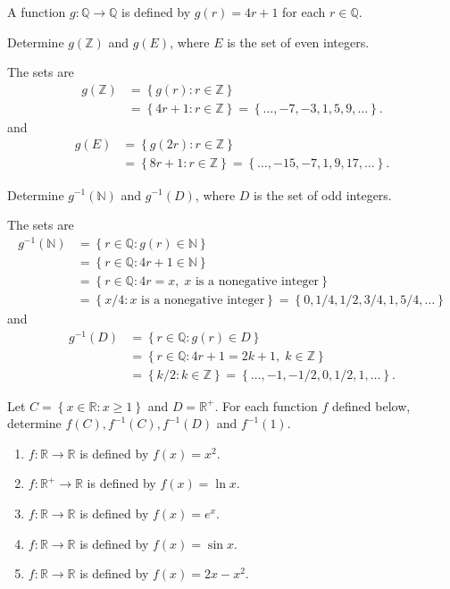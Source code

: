 \documentclass[12pt]{article}
\newcommand{\N}{\mathbb{N}}
\newcommand{\Z}{\mathbb{Z}}
\newcommand{\R}{\mathbb{R}}
\newcommand{\Q}{\mathbb{Q}}
\newenvironment{problem}[2][Problem]{\begin{trivlist} \item[\hskip \labelsep {\bfseries #1}\hskip \labelsep {\bfseries #2.}]}{\end{trivlist}}
\newenvironment{solution}[2][Solution]{\begin{trivlist} \item[\hskip \labelsep {\bfseries #1}\hskip \labelsep {\bfseries #2.}]}{\end{trivlist}}
\begin{document}
    \begin{problem}{10}
      A function $g:\Q\to \Q$ is defined by $g(r) = 4r+1$ for each $r\in \Q$.
      \begin{enumerate}[label=(\alph*)]
	\item Determine $g(\Z)$ and $g(E)$, where $E$ is the set of even integers.
	  \begin{solution}{(a)}
	    The sets are
    \begin{align*}
      g(\Z) &= \left\{g(r):r\in\Z \right\}\\
    &= \left\{4r+1:r\in\Z \right\}=\left\{\dots,-7,-3,1,5,9,\dots\right\}.
    \end{align*}
    and
    \begin{align*}
      g(E) &= \left\{g(2r):r\in\Z\right\}\\
      &= \left\{8r+1:r\in\Z\right\}=\left\{\dots,-15,-7,1,9,17,\dots\right\}.
    \end{align*}
    \end{solution}
	\item Determine $g^{-1}(\N)$ and $g^{-1}(D)$, where $D$ is the set of odd integers.
    \begin{solution}{(b)}
      The sets are
    \begin{align*}
      g^{-1}(\N) &= \left\{r\in\Q:g(r)\in\N\right\}\\
      &= \left\{r\in\Q:4r+1\in\N\right\}\\
      &= \left\{r\in\Q:4r=x, \; x\text{ is a nonegative integer}\right\}\\
      &= \left\{x/4: x\text{ is a nonegative integer}\right\} = \left\{0,1/4,1/2,3/4,1,5/4,\dots\right\}
    \end{align*}
    and
    \begin{align*}
      g^{-1}(D) &= \left\{r\in\Q:g(r)\in D\right\}\\
      &= \left\{r\in\Q: 4r+1=2k+1,\; k\in\Z\right\}\\
      &= \left\{k/2: k\in\Z\right\} = \left\{\dots,-1,-1/2,0,1/2,1,\dots\right\}.
    \end{align*}
    \end{solution}
    \end{enumerate}
    \end{problem}

    \begin{problem}{11}
      Let $C=\left\{ x\in\R:x\geq 1 \right\}$ and $D=\R^{+}$. For each function $f$ defined below, determine $f(C),f^{-1}(C),f^{-1}(D)$ and $f^{-1}({1})$.
      \begin{enumerate}[label=(\alph*)]
	\item $f:\R\to\R$ is defined by $f(x)=x^{2}$.
	\item $f:\R^{+}\to\R$ is defined by $f(x)=\ln{x}$.
	\item $f:\R\to\R$ is defined by $f(x)=e^{x}$.
	\item $f:\R\to\R$ is defined by $f(x)=\sin{x}$.
	\item $f:\R\to\R$ is defined by $f(x)=2x-x^{2}$.
    \end{enumerate}
    \end{problem}
\end{document}
